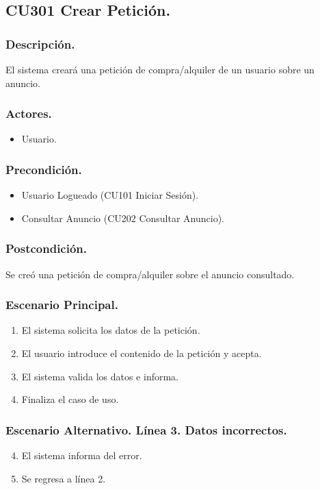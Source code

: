 \subsection{CU301 Crear Petici\'{o}n.}
\subsubsection{Descripci\'{o}n.}
El sistema crear\'{a} una petici\'{o}n de compra/alquiler de un usuario sobre un anuncio.
\subsubsection{Actores.}
\begin{itemize}
\item Usuario.
\end{itemize}
\subsubsection{Precondici\'{o}n.}
\begin{itemize}
\item Usuario Logueado (CU101 Iniciar Sesi\'{o}n).
\item Consultar Anuncio (CU202 Consultar Anuncio).
\end{itemize}
\subsubsection{Postcondici\'{o}n.}
Se cre\'{o} una petici\'{o}n de compra/alquiler sobre el anuncio consultado.
\subsubsection{Escenario Principal.}
\begin{enumerate}
\item El sistema solicita los datos de la petici\'{o}n.
\item El usuario introduce el contenido de la petici\'{o}n y acepta.
\item El sistema valida los datos e informa.
\item Finaliza el caso de uso.
\end{enumerate}
\subsubsection{Escenario Alternativo. L\'{i}nea 3. Datos incorrectos.}
\begin{enumerate}
\setcounter{enumi}{3}
\item El sistema informa del error.
\item Se regresa a l\'{i}nea 2.
\end{enumerate}
